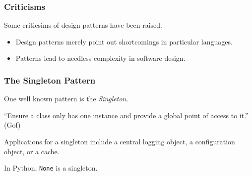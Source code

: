 \documentclass[10pt]{beamer}
\begin{document}
\begin{frame}
  \frametitle{Criticisms}
  
  Some criticsims of design patterns have been raised.
  
  \begin{itemize}
    \item Design patterns merely point out shortcomings in particular languages.
    \item Patterns lead to needless complexity in software design.
  \end{itemize}

  \end{frame}
\begin{frame}
  \frametitle{The Singleton Pattern} 
  
  One well known pattern is the \emph{Singleton}.
  
  \vspace{5mm}
  ``Ensure a class only has one instance and provide a global point of 
  access to it.'' (Gof)
  
  \vspace{5mm}
  Applications for a singleton include a central logging object, a configuration object,
  or a cache.
  
  \vspace{5mm}
  In Python, \texttt{None} is a singleton.

  \end{frame}
\end{document}
